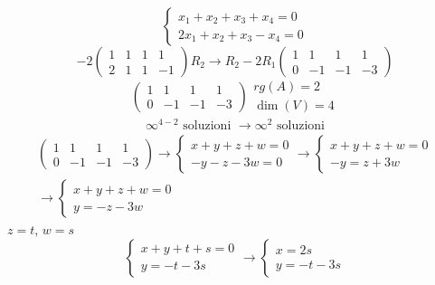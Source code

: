 \begin{equation*}
   \begin{cases}
     x_1+x_2+x_3+x_4=0\\
    2x_1+x_2+x_3-x_4=0   
  \end{cases}  
\end{equation*}
\begin{equation*}
  -2
  \begin{pmatrix}
    1 & 1 & 1 &1\\
    2 & 1 & 1 & -1
  \end{pmatrix} R_2\to R_2-2R_1
  \begin{pmatrix}
    1 & 1 & 1 & 1\\
    0 & -1 & -1 & -3
  \end{pmatrix}
\end{equation*}
\begin{equation*}
   \begin{pmatrix}
    1 & 1 & 1 & 1\\
    0 & -1 & -1 & -3
  \end{pmatrix}
  \begin{array}{l}
    rg (A)=2\\
    \dim(V)=4
  \end{array}
\end{equation*}
\begin{eqnarray*}
  \infty^{4-2} \text{ soluzioni }\to \infty^2 \text{ soluzioni}
\end{eqnarray*}
\begin{eqnarray*}
  \begin{pmatrix}
    1 & 1 & 1 & 1\\
    0 & -1 & -1 & -3
  \end{pmatrix}\to
  \begin{cases}
    x+y+z+w=0\\
    -y-z-3w=0
  \end{cases}\to 
  \begin{cases}
    x+y+z+w=0\\
    -y=z+3w
  \end{cases}\\
  \to \begin{cases}
    x+y+z+w=0\\
    y=-z-3w
  \end{cases}
\end{eqnarray*}
$z=t$, $w=s$
\begin{equation*}
  \begin{cases}
    x+y+t+s=0\\
    y=-t-3s
  \end{cases}\to
  \begin{cases}
    x=2s\\
    y=-t-3s
  \end{cases}
\end{equation*}
